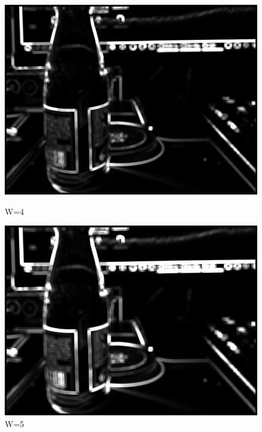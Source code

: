 \documentclass[11pt]{jarticle}
\begin{document}
\begin{figure}[t]
    \begin{minipage}{0.5\hsize}
        \centering
        \includegraphics[scale=.3]{w4.jpg}
        \caption{W=4}
    \end{minipage}
    \begin{minipage}{0.5\hsize}
        \centering
        \includegraphics[scale=.3]{w5.jpg}
        \caption{W=5}
    \end{minipage}
\end{figure}
\end{document}
